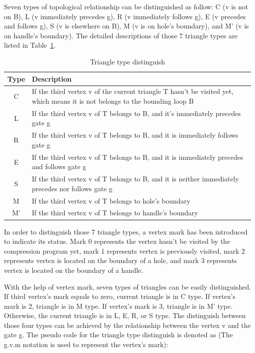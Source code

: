 \documentclass[onecolumn, 12pt]{article}
\begin{document}
{Seven types of topological relationship can be distinguished as follow: C (v is not on B), L (v immediately precedes g), R (v immediately follows g), E (v precedes and follows g), S (v is elsewhere on B), M (v is on hole's boundary), and M' (v is on handle's boundary). \cite{Edgebreaker} The detailed descriptions of those 7 triangle types are listed in Table~\ref{tab:triType}.

\begin{table}[h]
\normalsize
\centering
\caption{Triangle type distinguish}
  \begin{tabular}{ | c | p{} | }
    \hline
    Type & Description \\
    \hline
    C & If the third vertex v of the current triangle T hasn't be visited yet, which means it is not belongs to the bounding loop B \\
    \hline
    L & If the third vertex v of T belongs to B, and it's immediately precedes gate g \\
    \hline
    R & If the third vertex v of T belongs to B, and it is immediately follows gate g \\
    \hline
    E & If the third vertex v of T belongs to B, and it is immediately precedes and follows gate g \\
    \hline
    S & If the third vertex v of T belongs to B, and it is neither immediately precedes nor follows gate g \\
    \hline
    M & If the third vertex v of T belongs to hole's boundary \\
    \hline
    M' & If the third vertex v of T belongs to handle's boundary \\
    \hline
    \hline
  \end{tabular}
  \label{tab:triType}
\end{table}

In order to distinguish those 7 triangle types, a vertex mark has been introduced to indicate its status. Mark 0 represents the vertex hasn't be visited by the compression program yet, mark 1 represents vertex is previously visited, mark 2 represents vertex is located on the boundary of a hole, and mark 3 represents vertex is located on the boundary of a handle.

With the help of vertex mark, seven types of triangles can be easily distinguished. If third vertex's mark equals to zero, current triangle is in C type. If vertex's mark is 2, triangle is in M type. If vertex's mark is 3, triangle is in M' type. Otherwise, the current triangle is in L, E, R, or S type. The distinguish between those four types can be achieved by the relationship between the vertex v and the gate g. The pseudo code for the triangle type distinguish is denoted as (The g.v.m notation is used to represent the vertex's mark):

}
\end{document}
